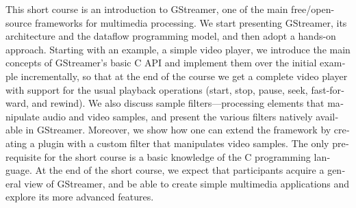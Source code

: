 \begin{otherlanguage}{english}
  This short course is an introduction to GStreamer, one of the main
  free/open-source frameworks for multimedia processing.  We start
  presenting GStreamer, its architecture and the dataflow programming
  model, and then adopt a hands-on approach.  Starting with an example, a
  simple video player, we introduce the main concepts of GStreamer’s basic C
  API and implement them over the initial example incrementally, so that at
  the end of the course we get a complete video player with support for
  the usual playback operations (start, stop, pause, seek, fast-forward,
  and rewind).  We also discuss sample filters---processing elements that
  manipulate audio and video samples, and present the various filters
  natively available in GStreamer.  Moreover, we show how one can extend the
  framework by creating a plugin with a custom filter that manipulates
  video samples.  The only prerequisite for the short course is a basic
  knowledge of the C programming language.  At the end of the short
  course, we expect that participants acquire a general view of GStreamer,
  and be able to create simple multimedia applications and explore its
  more advanced features.
\end{otherlanguage}

